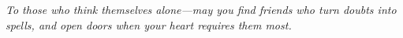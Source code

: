 \cleardoublepage
\begingroup
  \hypersetup{pageanchor=false}%
  \thispagestyle{empty}
  \vspace*{\fill}
  \begin{center}\itshape
  To those who think themselves alone—may you find friends who turn doubts into spells, and open doors when your heart requires them most.
  \end{center}
  \vspace*{\fill}
  \clearpage
\endgroup